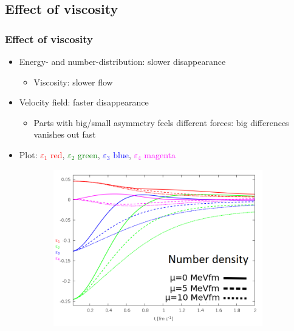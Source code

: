 \documentclass{beamer}
\begin{document}
\subsection{Effect of viscosity}
\begin{frame}
\frametitle{Effect of viscosity}
\begin{center}
\begin{itemize}
  \setlength{\itemsep}{2pt}

\item<1-> Energy- and number-distribution: slower disappearance
\begin{itemize}
\item<1-> Viscosity: slower flow
\end{itemize}
\item<1-> Velocity field: faster disappearance
\begin{itemize}
\item<1-> Parts with big/small asymmetry feels different forces: big differences vanishes out fast
\end{itemize}
\item Plot: \large{\textcolor{red}{$\varepsilon_1$ red}, \textcolor{green}{$\varepsilon_2$ green}, \textcolor{blue}{$\varepsilon_3$ blue},  \textcolor{magenta}{$\varepsilon_4$ magenta}}
\end{itemize}
\begin{figure}[H]
	\centering
    \begin{subfigure}[b]{0.49\textwidth}
    		\includegraphics[width=\textwidth]{pic/res/nonrel/eps_visc_r}
	\end{subfigure}
	\begin{subfigure}[b]{0.49\textwidth}

\end{subfigure}
\end{figure}
\end{center}
\end{frame}
\end{document}
